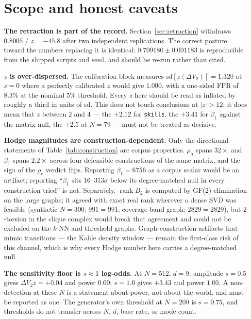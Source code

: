 \documentclass[11pt,a4paper]{article}
\theoremstyle{plain}
\theoremstyle{remark}
\theoremstyle{plain}
\begin{document}
\section{Scope and honest caveats}
\label{sec:scope}

\textbf{The retraction is part of the record.} Section~\ref{sec:retraction} withdraws $0.8005$ / $z=-45.8$ after two independent replications. The correct posture toward the numbers replacing it is identical: $0.709180\pm0.001183$ is reproducible from the shipped scripts and seed, and should be re-run rather than cited.

\textbf{$z$ is over-dispersed.} The calibration block measures $\mathrm{sd}[z(\Delta V_2)]=1.320$ at $s=0$ where a perfectly calibrated $z$ would give $1.000$, with a one-sided FPR of $8.3\%$ at the nominal $5\%$ threshold. Every $z$ here should be read as inflated by roughly a third in units of sd. This does not touch conclusions at $|z|>12$; it does mean that $z$ between $2$ and $4$ --- the $+2.12$ for \texttt{skills}, the $+3.41$ for $\beta_1$ against the matrix null, the $+2.5$ at $N=79$ --- must not be treated as decisive.

\textbf{Hodge magnitudes are construction-dependent.} Only the directional statements of Table~\ref{tab:construction} are corpus properties. $\rho_{\mathrm h}$ spans $32\times$ and $\beta_1$ spans $2.2\times$ across four defensible constructions of the same matrix, and the sign of the $\rho_{\mathrm c}$ verdict flips. Reporting $\beta_1=6756$ as a corpus scalar would be an artifact; reporting ``$\beta_1$ sits $16$--$313\sigma$ below its degree-matched null in every construction tried'' is not. Separately, $\operatorname{rank}B_2$ is computed by GF(2) elimination on the large graphs; it agreed with exact real rank wherever a dense SVD was feasible (synthetic $N=300$: $991=991$; coverage-band graph: $2829=2829$), but $2$-torsion in the clique complex would break that agreement and could not be excluded on the $k$-NN and threshold graphs. Graph-construction artifacts that mimic transitions --- the Kahle density window --- remain the first-class risk of this channel, which is why every Hodge number here carries a degree-matched null.

\textbf{The sensitivity floor is $s\approx1$ log-odds.} At $N=512$, $d=9$, amplitude $s=0.5$ gives $\Delta V_2z=+0.04$ and power $0.00$; $s=1.0$ gives $+3.43$ and power $1.00$. A non-detection at these $N$ is a statement about power, not about the world, and must be reported as one. The generator's own threshold at $N=200$ is $s=0.75$, and thresholds do not transfer across $N$, $d$, base rate, or mode count.
\end{document}
